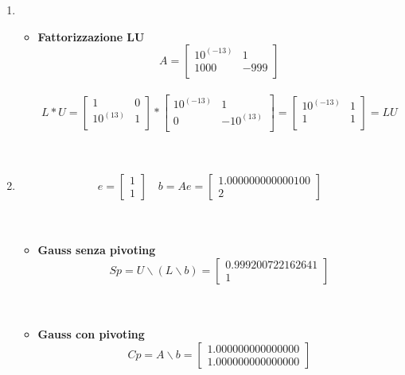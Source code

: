 \begin{enumerate}
	\item 
	\begin{itemize}
		\item \textbf{Fattorizzazione LU}
			\[
			A =\begin{bmatrix}
				10^{(-13)} &   1  \\
	 			1000   & -999 \\
			\end{bmatrix}
			\]\\
			\[
			L*U =\begin{bmatrix}
				1    & 0 \\
				10^{(13)} & 1 \\
			\end{bmatrix} *
			\begin{bmatrix}
				10^{(-13)} & 1    \\
				0      	  & -10^{(13)} \\
			\end{bmatrix} 
			= \begin{bmatrix}
				10^{(-13)} &   1  \\
				1   & 1 \\
			\end{bmatrix} = LU
			\]\\\
	\end{itemize}
	\item
		\[
		e = \begin{bmatrix}
			1 \\
			1
		\end{bmatrix} \quad 
		b = Ae =\begin{bmatrix}
			1.000000000000100 \\
			2                 
		\end{bmatrix}
		\]\\\
	\begin{itemize}
	\item \textbf{Gauss senza pivoting}
		\[
		Sp = U \backslash (L \backslash b) = \begin{bmatrix}
			0.999200722162641 \\
    		1
		\end{bmatrix}
		\]\\\
	\end{itemize}
	\begin{itemize}
	\item \textbf{Gauss con pivoting}
		\[
		Cp = A \backslash b =\begin{bmatrix}
			1.000000000000000 \\
    		1.000000000000000 
		\end{bmatrix}
		\]
	\end{itemize}
\end{enumerate}